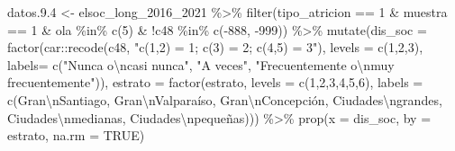 \documentclass[
  12pt,
]{book}
\newenvironment{Shaded}{\begin{snugshade}}{\end{snugshade}}
\newcommand{\AttributeTok}[1]{\textcolor[rgb]{0.77,0.63,0.00}{#1}}
\newcommand{\ConstantTok}[1]{\textcolor[rgb]{0.00,0.00,0.00}{#1}}
\newcommand{\DecValTok}[1]{\textcolor[rgb]{0.00,0.00,0.81}{#1}}
\newcommand{\FloatTok}[1]{\textcolor[rgb]{0.00,0.00,0.81}{#1}}
\newcommand{\FunctionTok}[1]{\textcolor[rgb]{0.00,0.00,0.00}{#1}}
\newcommand{\NormalTok}[1]{#1}
\newcommand{\OtherTok}[1]{\textcolor[rgb]{0.56,0.35,0.01}{#1}}
\newcommand{\SpecialCharTok}[1]{\textcolor[rgb]{0.00,0.00,0.00}{#1}}
\newcommand{\StringTok}[1]{\textcolor[rgb]{0.31,0.60,0.02}{#1}}
\begin{document}
\begin{Shaded}
\begin{Highlighting}[]
\NormalTok{datos.}\FloatTok{9.4} \OtherTok{\textless{}{-}}\NormalTok{ elsoc\_long\_2016\_2021 }\SpecialCharTok{\%\textgreater{}\%} 
  \FunctionTok{filter}\NormalTok{(tipo\_atricion }\SpecialCharTok{==} \DecValTok{1} \SpecialCharTok{\&}\NormalTok{ muestra }\SpecialCharTok{==} \DecValTok{1} \SpecialCharTok{\&}\NormalTok{ ola }\SpecialCharTok{\%in\%} \FunctionTok{c}\NormalTok{(}\DecValTok{5}\NormalTok{) }\SpecialCharTok{\&} \SpecialCharTok{!}\NormalTok{c48 }\SpecialCharTok{\%in\%} \FunctionTok{c}\NormalTok{(}\SpecialCharTok{{-}}\DecValTok{888}\NormalTok{, }\SpecialCharTok{{-}}\DecValTok{999}\NormalTok{)) }\SpecialCharTok{\%\textgreater{}\%} 
  \FunctionTok{mutate}\NormalTok{(}\AttributeTok{dis\_soc =} \FunctionTok{factor}\NormalTok{(car}\SpecialCharTok{::}\FunctionTok{recode}\NormalTok{(c48, }\StringTok{"c(1,2) = 1; c(3) = 2; c(4,5) = 3"}\NormalTok{),}
                               \AttributeTok{levels =} \FunctionTok{c}\NormalTok{(}\DecValTok{1}\NormalTok{,}\DecValTok{2}\NormalTok{,}\DecValTok{3}\NormalTok{),}
                               \AttributeTok{labels=} \FunctionTok{c}\NormalTok{(}\StringTok{"Nunca o}\SpecialCharTok{\textbackslash{}n}\StringTok{casi nunca"}\NormalTok{, }\StringTok{"A veces"}\NormalTok{,}
                                         \StringTok{"Frecuentemente o}\SpecialCharTok{\textbackslash{}n}\StringTok{muy frecuentemente"}\NormalTok{)),}
         \AttributeTok{estrato =} \FunctionTok{factor}\NormalTok{(estrato, }\AttributeTok{levels =} \FunctionTok{c}\NormalTok{(}\DecValTok{1}\NormalTok{,}\DecValTok{2}\NormalTok{,}\DecValTok{3}\NormalTok{,}\DecValTok{4}\NormalTok{,}\DecValTok{5}\NormalTok{,}\DecValTok{6}\NormalTok{),}
                          \AttributeTok{labels =} \FunctionTok{c}\NormalTok{(}\StringTok{\textquotesingle{}Gran}\SpecialCharTok{\textbackslash{}n}\StringTok{Santiago\textquotesingle{}}\NormalTok{, }\StringTok{\textquotesingle{}Gran}\SpecialCharTok{\textbackslash{}n}\StringTok{Valparaíso\textquotesingle{}}\NormalTok{, }\StringTok{\textquotesingle{}Gran}\SpecialCharTok{\textbackslash{}n}\StringTok{Concepción\textquotesingle{}}\NormalTok{,}
                                     \StringTok{\textquotesingle{}Ciudades}\SpecialCharTok{\textbackslash{}n}\StringTok{grandes\textquotesingle{}}\NormalTok{, }\StringTok{\textquotesingle{}Ciudades}\SpecialCharTok{\textbackslash{}n}\StringTok{medianas\textquotesingle{}}\NormalTok{, }\StringTok{\textquotesingle{}Ciudades}\SpecialCharTok{\textbackslash{}n}\StringTok{pequeñas\textquotesingle{}}\NormalTok{))) }\SpecialCharTok{\%\textgreater{}\%}
  \FunctionTok{prop}\NormalTok{(}\AttributeTok{x =}\NormalTok{ dis\_soc, }\AttributeTok{by =}\NormalTok{ estrato, }\AttributeTok{na.rm =} \ConstantTok{TRUE}\NormalTok{)}


\end{Highlighting}
\end{Shaded}
\end{document}
